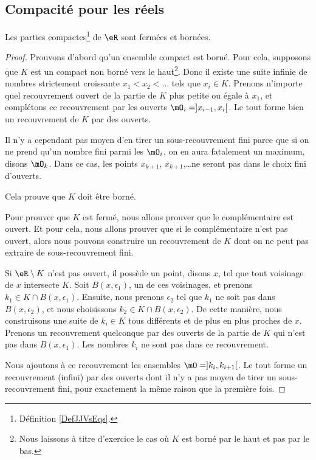 \subsection{Compacité pour les réels}

\begin{proposition}     \label{PROPooBFSAooKSugMj}
	Les parties compactes\footnote{Définition \ref{DefJJVsEqs}.} de \( \eR\) sont fermées et bornées.
\end{proposition}

\begin{proof}
	Prouvons d'abord qu'un ensemble compact est borné. Pour cela, supposons que $K$ est un compact non borné vers le haut\footnote{Nous laissons à titre d'exercice le cas où $K$ est borné par le haut et pas par le bas.}. Donc il existe une suite infinie de nombres strictement croissante $x_1<x_2<\ldots$ tels que \( x_i\in K\). Prenons n'importe quel recouvrement ouvert de la partie de \( K\) plus petite ou égale à \( x_1\), et complétons ce recouvrement par les ouverts \( \mO_i=]x_{i-1},x_i[\). Le tout forme bien un recouvrement de \( K\) par des ouverts.

	Il n'y a cependant pas moyen d'en tirer un sous-recouvrement fini parce que si on ne prend qu'un nombre fini parmi les \( \mO_i\), on en aura fatalement un maximum, disons \( \mO_k\). Dans ce cas, les points \( x_{k+1}\), \( x_{k+1}\),\ldots ne seront pas dans le choix fini d'ouverts.

	Cela prouve que \( K\) doit être borné.

	Pour prouver que \( K\) est fermé, nous allons prouver que le complémentaire est ouvert. Et pour cela, nous allons prouver que si le complémentaire n'est pas ouvert, alors nous pouvons construire un recouvrement de \( K\) dont on ne peut pas extraire de sous-recouvrement fini.

	Si \( \eR\setminus K\) n'est pas ouvert, il possède un point, disons \( x\), tel que tout voisinage de \( x\) intersecte \( K\). Soit \( B(x,\epsilon_1)\), un de ces voisinages, et prenons \( k_1\in K\cap B(x,\epsilon_1)\). Ensuite, nous prenons \( \epsilon_2\) tel que \( k_1\) ne soit pas dans \( B(x,\epsilon_2)\), et nous choisissons \( k_2\in K\cap B(x,\epsilon_2)\). De cette manière, nous construisons une suite de \( k_i\in K\) tous différents et de plus en plus proches de \( x\). Prenons un recouvrement quelconque par des ouverts de la partie de \( K\) qui n'est pas dans \( B(x,\epsilon_1)\). Les nombres \( k_i\) ne sont pas dans ce recouvrement.

	Nous ajoutons à ce recouvrement les ensembles \( \mO=]k_i,k_{i+1}[\). Le tout forme un recouvrement (infini) par des ouverts dont il n'y a pas moyen de tirer un sous-recouvrement fini, pour exactement la même raison que la première fois.
\end{proof}

